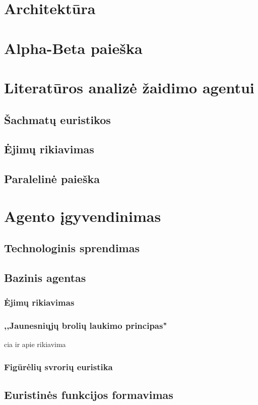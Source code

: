 \documentclass[]{VUMIFTemplateClass}
\begin{document}
\section{Architektūra}

\section{Alpha-Beta paieška}

\section{Literatūros analizė žaidimo agentui}
\subsection{Šachmatų euristikos}
\subsection{Ėjimų rikiavimas}
\subsection{Paralelinė paieška}

\section{Agento įgyvendinimas}
\subsection{Technologinis sprendimas}
\subsection{Bazinis agentas}
\subsubsection{Ėjimų rikiavimas}
\subsubsection{,,Jaunesniųjų brolių laukimo principas"}
cia ir apie rikiavima
\subsubsection{Figūrėlių svrorių euristika}

\subsection{Euristinės funkcijos formavimas}
\end{document}
